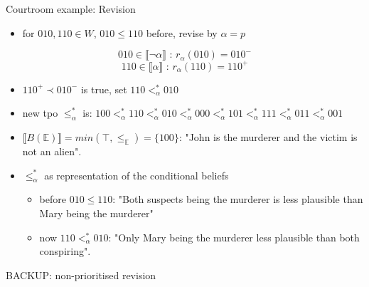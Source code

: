 \documentclass[11pt]{beamer}
\newcommand{\modelsOf}[1]{\llbracket #1 \rrbracket}
\begin{document}
\begin{frame}{Courtroom example: Revision}

    \begin{itemize}
        \item for $010, 110 \in W$, $010 \leq 110$ before, revise by $\alpha = p$
    \end{itemize}

    \begin{equation*}
        010 \in \modelsOf{\neg\alpha} \textrm{ : } r_{\alpha}(010) = 010^{-}
    \end{equation*}
    \begin{equation*}
        110 \in \modelsOf{\alpha} \textrm{ : } r_{\alpha}(110) = 110^{+}
    \end{equation*}
    
    \begin{itemize}
        \item $110^{+} \prec 010^{-}$ is true, set $110 <_{\alpha}^{\ast} 010$
        \item new tpo $\leq_{\alpha}^{\ast}$ is: $100 <_{\alpha}^{\ast} 110 <_{\alpha}^{\ast} 010 <_{\alpha}^{\ast} 000 <_{\alpha}^{\ast} 101 <_{\alpha}^{\ast} 111 <_{\alpha}^{\ast} 011 <_{\alpha}^{\ast} 001$
        \item $\modelsOf{B(\mathbb{E})} = min(\top, \leq_{\mathbb{E}}) = \{100\}$: "John is the murderer and the victim is not an alien".
        \item $\leq_{\alpha}^{\ast}$ as representation of the conditional beliefs
        \begin{itemize}
            \item before $010 \leq 110$: "Both suspects being the murderer is less plausible than Mary being the murderer"
            \item now $110 <_{\alpha}^{\ast} 010$: "Only Mary being the murderer less plausible than both conspiring".
        \end{itemize}
    \end{itemize}
    
\end{frame}


\begin{frame}{BACKUP: non-prioritised revision}
\end{frame}
\end{document}
